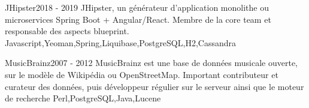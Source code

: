 %
%
%


\begin{projects}
	\project
	{JHipster}{2018 - 2019}
	{ }
	{JHipster, un générateur d'application monolithe ou microservices Spring Boot + Angular/React. Membre de la core team et responsable des aspects blueprint.}
	{Javascript,Yeoman,Spring,Liquibase,PostgreSQL,H2,Cassandra}

	\project
	{MusicBrainz}{2007 - 2012}
	{ }
	{MusicBrainz est une base de données musicale ouverte, sur le modèle de Wikipédia ou OpenStreetMap. Important contributeur et curateur des données, puis développeur régulier sur le serveur ainsi que le moteur de recherche}
	{Perl,PostgreSQL,Java,Lucene}

\end{projects}

